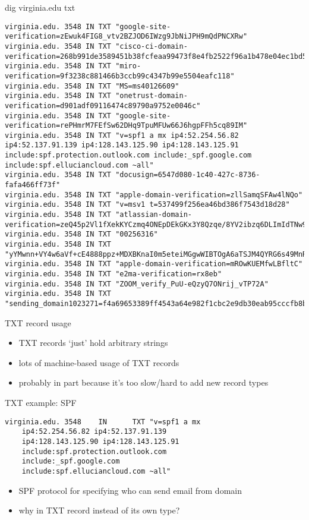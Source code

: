 \begin{frame}[fragile]{dig virginia.edu txt}
\begin{Verbatim}[fontsize=\fontsize{8}{9}]
virginia.edu. 3548 IN TXT "google-site-verification=zEwuk4FIG8_vtv2BZJOD6IWzg9JbNiJPH9mQdPNCXRw"
virginia.edu. 3548 IN TXT "cisco-ci-domain-verification=268b991de3589451b38fcfeaa99473f8e4fb2522f96a1b478e04ec1bd5a25ff9"
virginia.edu. 3548 IN TXT "miro-verification=9f3238c881466b3ccb99c4347b99e5504eafc118"
virginia.edu. 3548 IN TXT "MS=ms40126609"
virginia.edu. 3548 IN TXT "onetrust-domain-verification=d901adf09116474c89790a9752e0046c"
virginia.edu. 3548 IN TXT "google-site-verification=rePHmrM7FEfSw62DHq9TpuMFUw66J6hgpFFh5cq89IM"
virginia.edu. 3548 IN TXT "v=spf1 a mx ip4:52.254.56.82 ip4:52.137.91.139 ip4:128.143.125.90 ip4:128.143.125.91 include:spf.protection.outlook.com include:_spf.google.com include:spf.elluciancloud.com ~all"
virginia.edu. 3548 IN TXT "docusign=6547d080-1c40-427c-8736-fafa466ff73f"
virginia.edu. 3548 IN TXT "apple-domain-verification=zllSamqSFAw4lNQo"
virginia.edu. 3548 IN TXT "v=msv1 t=537499f256ea46bd386f7543d18d28"
virginia.edu. 3548 IN TXT "atlassian-domain-verification=zeQ45p2Vl1fXekKYCzmq4ONEpDEkGKx3Y8Qzqe/8YV2ibzq6DLImIdTNw9Cv4lda"
virginia.edu. 3548 IN TXT "00256316"
virginia.edu. 3548 IN TXT "yYMwnn+VY4w6aVf+cE4888ppz+MDXBKnaI0m5eteiMGgwWIBTOgA6aTSJM4QYRG6s49MnR2Fj0grzaOKokmCow=="
virginia.edu. 3548 IN TXT "apple-domain-verification=mROwKUEMfwLBfltC"
virginia.edu. 3548 IN TXT "e2ma-verification=rx8eb"
virginia.edu. 3548 IN TXT "ZOOM_verify_PuU-eQzyQ7ONrij_vTP72A"
virginia.edu. 3548 IN TXT "sending_domain1023271=f4a69653389ff4543a64e982f1cbc2e9db30eab95cccfb8be58d883ce7849448"
\end{Verbatim}
\end{frame}

\begin{frame}{TXT record usage}
\begin{itemize}
\item TXT records `just' hold arbitrary strings
\item lots of machine-based usage of TXT records
\item probably in part because it's too slow/hard to add new record types
\end{itemize}
\end{frame}

\begin{frame}[fragile]{TXT example: SPF}
\begin{Verbatim}[fontsize=\small]
virginia.edu. 3548    IN      TXT "v=spf1 a mx
    ip4:52.254.56.82 ip4:52.137.91.139
    ip4:128.143.125.90 ip4:128.143.125.91
    include:spf.protection.outlook.com
    include:_spf.google.com
    include:spf.elluciancloud.com ~all"
\end{Verbatim}
\begin{itemize}
\item SPF protocol for specifying who can send email from domain
\item why in TXT record instead of its own type?
\end{itemize}
\end{frame}

